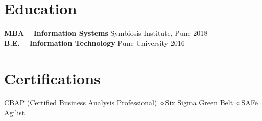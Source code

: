 \documentclass[10pt,a4paper]{article}
\begin{document}
\section{Education}
\textbf{MBA -- Information Systems} \hfill Symbiosis Institute, Pune \hfill 2018\\
\textbf{B.E. -- Information Technology} \hfill Pune University \hfill 2016

\section{Certifications}
CBAP (Certified Business Analysis Professional) \quad$\diamond$\quad Six Sigma Green Belt \quad$\diamond$\quad SAFe Agilist
\end{document}
